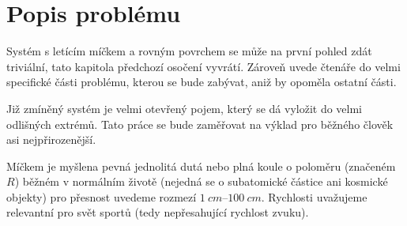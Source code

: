 \section{Popis problému}
\label{sec:popis-problemu}

Systém s letícím míčkem a rovným povrchem se může na první pohled zdát
triviální, tato kapitola předchozí osočení vyvrátí. Zároveň uvede čtenáře do
velmi specifické části problému, kterou se bude zabývat, aniž by opoměla ostatní
části.

Již zmíněný systém je velmi otevřený pojem, který se dá
vyložit do velmi odlišných extrémů. Tato práce se bude zaměřovat na výklad pro
běžného člověk asi nejpřirozenější.

Míčkem je myšlena pevná jednolitá dutá nebo plná koule o poloměru (značeném $R$)
běžném v normálním životě (nejedná se o subatomické částice ani kosmické
objekty) pro přesnost uvedeme rozmezí $\qtyrange{1}{100}{cm}$. Rychlosti
uvažujeme relevantní pro svět sportů (tedy nepřesahující rychlost zvuku).




